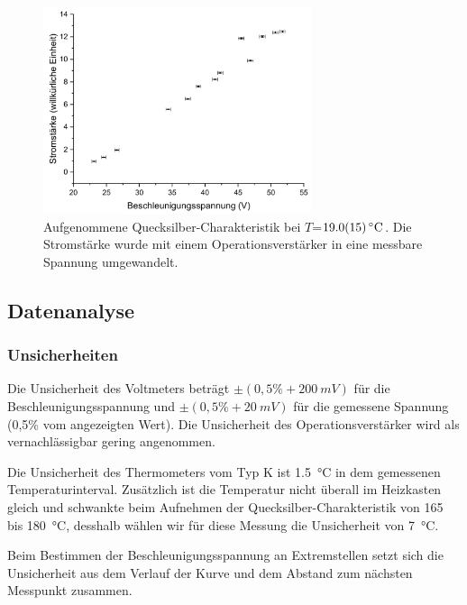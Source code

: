 \documentclass[
	a4paper,
	12pt,
	pagesize,
	ngerman
]{scrartcl}
\begin{document}
	
	\begin{figure}[H]
		\includegraphics[width=0.7\textwidth]{Hg19}
		\centering
		\caption{Aufgenommene Quecksilber-Charakteristik bei $T$=$\SI{19,0 +- 1,5}{\degreeCelsius}$. Die Stromstärke wurde mit einem Operationsverstärker in eine messbare Spannung umgewandelt.}
		\label{Hg19}
		\centering
	\end{figure}
	
	\subsection{Datenanalyse}
	\subsubsection{Unsicherheiten}
	Die Unsicherheit des  Voltmeters beträgt $\pm (0,5\% + \SI{200}{mV})$ für die Beschleunigungsspannung und $\pm (0,5\% + \SI{20}{mV})$ für die gemessene Spannung (0,5\% vom angezeigten Wert).\cite{FH-Pforzheim} Die Unsicherheit des Operationsverstärker wird als vernachlässigbar gering angenommen. 
	
	Die Unsicherheit des Thermometers vom Typ K ist \SI{1,5}{\degreeCelsius} in dem gemessenen Temperaturinterval.\cite{DIN} 
	Zusätzlich ist die Temperatur nicht überall im Heizkasten gleich und schwankte beim Aufnehmen der Quecksilber-Charakteristik von 165 bis \SI{180}{\degreeCelsius}, desshalb wählen wir für diese Messung die Unsicherheit von \SI{7}{\degreeCelsius}.
	
	Beim Bestimmen der Beschleunigungsspannung an Extremstellen setzt sich die Unsicherheit aus dem Verlauf der Kurve und dem Abstand zum nächsten Messpunkt zusammen. %
	
\end{document}
